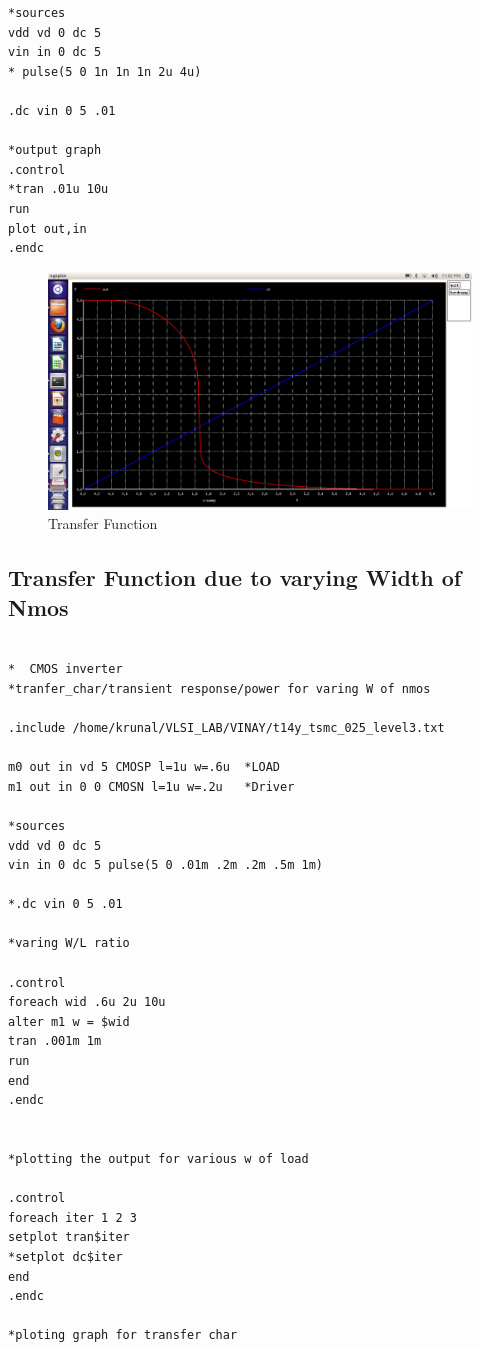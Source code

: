 \documentclass[12pt,a4paper]{article}
\begin{document}
\begin{center}
\begin{lstlisting}
*sources
vdd vd 0 dc 5
vin in 0 dc 5
* pulse(5 0 1n 1n 1n 2u 4u)

.dc vin 0 5 .01

*output graph
.control
*tran .01u 10u
run
plot out,in
.endc

\end{lstlisting}

\begin{figure}[!ht]
\centering
\includegraphics[scale=0.37]{lab5_1_pic1_transfer_fun_only.png}
 \caption[Short]{Transfer Function}
 \end{figure}
 
 \subsection{Transfer Function due to varying Width of Nmos}
 \begin{lstlisting}

*  CMOS inverter 
*tranfer_char/transient response/power for varing W of nmos 

.include /home/krunal/VLSI_LAB/VINAY/t14y_tsmc_025_level3.txt

m0 out in vd 5 CMOSP l=1u w=.6u  *LOAD 
m1 out in 0 0 CMOSN l=1u w=.2u	 *Driver

*sources
vdd vd 0 dc 5
vin in 0 dc 5 pulse(5 0 .01m .2m .2m .5m 1m)

*.dc vin 0 5 .01

*varing W/L ratio

.control
foreach wid .6u 2u 10u
alter m1 w = $wid
tran .001m 1m
run
end
.endc


*plotting the output for various w of load

.control
foreach iter 1 2 3
setplot tran$iter
*setplot dc$iter
end
.endc

*ploting graph for transfer char


\end{lstlisting}
\end{center}
\end{document}
